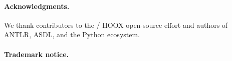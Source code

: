 \documentclass[11pt,a4paper]{article}
\begin{document}
\paragraph{Acknowledgments.}
We thank contributors to the \pyne{} / HOOX open-source effort and authors of
ANTLR, ASDL, and the Python  ecosystem.

\paragraph{Trademark notice.}
\trademarknote{}



\end{document}
